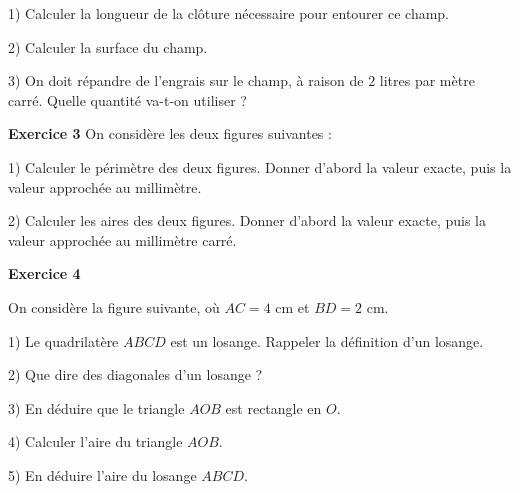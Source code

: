 \documentclass[14pt]{extreport}
\theoremstyle{plain}
\begin{document}
1) Calculer la longueur de la clôture nécessaire pour entourer ce champ. 

2) Calculer la surface du champ. 

3) On doit répandre de l'engrais sur le champ, à raison de $2$ litres par mètre carré. Quelle quantité va-t-on utiliser ? 

\newpage

\textbf{Exercice 3}
On considère les deux figures suivantes : 

\begin{figure}[H]
\center 
{}
\end{figure} 

1) Calculer le périmètre des deux figures. Donner d'abord la valeur exacte, puis la valeur approchée au millimètre. 

2) Calculer les aires des deux figures. Donner d'abord la valeur exacte, puis la valeur approchée au millimètre carré. 

\textbf{Exercice 4}


On considère la figure suivante, où $AC = 4$ cm et $BD = 2$ cm. 

\begin{figure}[H]
\center 
{}
\end{figure} 

1) Le quadrilatère $ABCD$ est un losange. Rappeler la définition d'un losange. 

2) Que dire des diagonales d'un losange ? 

3) En déduire que le triangle $AOB$ est rectangle en $O$. 

4) Calculer l'aire du triangle $AOB$. 

5) En déduire l'aire du losange $ABCD$. 
 
\end{document}

